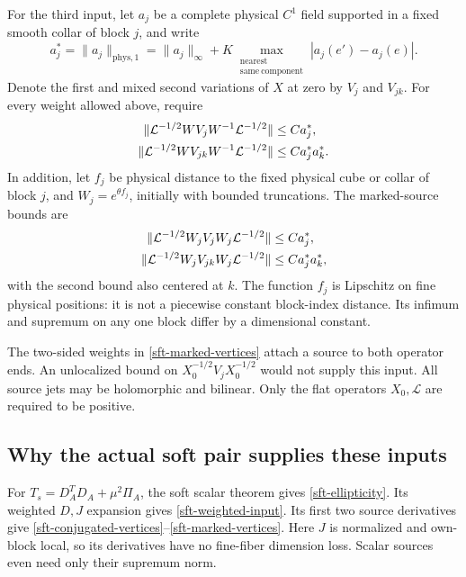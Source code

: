 For the third input, let \(a_j\) be a complete physical \(C^1\) field
supported in a fixed smooth collar of block \(j\), and write
\begin{equation}
 a_j^*=\|a_j\|_{\mathrm{phys},1}
 =\|a_j\|_\infty+
 K\max_{\substack{\mathrm{nearest}\\\mathrm{same\ component}}}
       |a_j(e')-a_j(e)|.
 \label{sft-source-norm}
\end{equation}
Denote the first and mixed second variations of \(X\) at zero by
\(V_j\) and \(V_{jk}\). For every weight allowed above, require
\begin{align}
 \|\mathcal L^{-1/2}WV_jW^{-1}\mathcal L^{-1/2}\|
     &\le Ca_j^*,\notag\\
 \|\mathcal L^{-1/2}WV_{jk}W^{-1}\mathcal L^{-1/2}\|
     &\le Ca_j^*a_k^*.
 \label{sft-conjugated-vertices}
\end{align}
In addition, let \(f_j\) be physical distance to the fixed physical
cube or collar of block \(j\), and \(W_j=e^{\theta f_j}\), initially
with bounded truncations. The marked-source bounds are
\begin{align}
 \|\mathcal L^{-1/2}W_jV_jW_j\mathcal L^{-1/2}\|
     &\le Ca_j^*,\notag\\
 \|\mathcal L^{-1/2}W_jV_{jk}W_j\mathcal L^{-1/2}\|
     &\le Ca_j^*a_k^*,
 \label{sft-marked-vertices}
\end{align}
with the second bound also centered at \(k\).
The function \(f_j\) is Lipschitz on fine physical positions:
it is not a piecewise constant block-index distance. Its infimum
and supremum on any one block differ by a dimensional constant.

The two-sided weights in \eqref{sft-marked-vertices} attach a source
to both operator ends. An unlocalized bound on
\(X_0^{-1/2}V_jX_0^{-1/2}\) would not supply this input.
All source jets may be holomorphic and bilinear. Only the flat
operators \(X_0,\mathcal L\) are required to be positive.

\subsection{Why the actual soft pair supplies these inputs}
\label{sft-application-inputs}

For \(T_s=D_A^TD_A+\mu^2\Pi_A\), the soft scalar theorem gives
\eqref{sft-ellipticity}. Its weighted \(D,J\) expansion gives
\eqref{sft-weighted-input}. Its first two source derivatives give
\eqref{sft-conjugated-vertices}--\eqref{sft-marked-vertices}.
Here \(J\) is normalized and own-block local, so its derivatives
have no fine-fiber dimension loss. Scalar sources even need only
their supremum norm.

